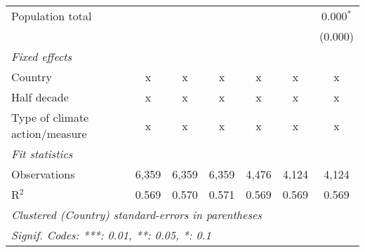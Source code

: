 \begin{tabular}{lcccccc}
   Population total                                               &              &                &                &                &                & 0.000$^{*}$\\   
                                                                  &              &                &                &                &                & (0.000)\\   
   \emph{Fixed effects}\\
   Country                                                        & x            & x              & x              & x              & x              & x\\  
   Half decade                                                    & x            & x              & x              & x              & x              & x\\  
   Type of climate action/measure                                 & x            & x              & x              & x              & x              & x\\  
   \midrule \emph{Fit statistics}\\
   Observations                                                   & 6,359        & 6,359          & 6,359          & 4,476          & 4,124          & 4,124\\  
   R$^2$                                                          & 0.569        & 0.570          & 0.571          & 0.569          & 0.569          & 0.569\\  
   \midrule
   \multicolumn{7}{l}{\emph{Clustered (Country) standard-errors in parentheses}}\\
   \multicolumn{7}{l}{\emph{Signif. Codes: ***: 0.01, **: 0.05, *: 0.1}}\\
\end{tabular}
\par\endgroup


